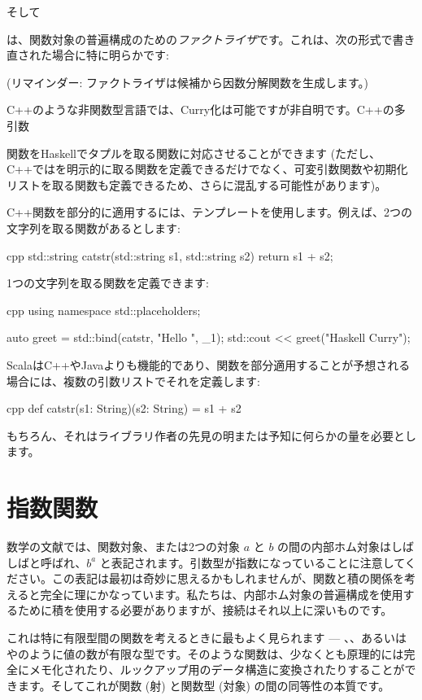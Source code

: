 そして

 は、関数対象の普遍構成のための\emph{ファクトライザ}です。これは、次の形式で書き直された場合に特に明らかです: 

 (リマインダー: ファクトライザは候補から因数分解関数を生成します。) 

C++のような非関数型言語では、Curry化は可能ですが非自明です。C++の多引数

関数をHaskellでタプルを取る関数に対応させることができます (ただし、C++ではを明示的に取る関数を定義できるだけでなく、可変引数関数や初期化リストを取る関数も定義できるため、さらに混乱する可能性があります)。

C++関数を部分的に適用するには、テンプレートを使用します。例えば、2つの文字列を取る関数があるとします: 

\begin{snip}{cpp}
std::string catstr(std::string s1, std::string s2) {
    return s1 + s2;
}
\end{snip}
1つの文字列を取る関数を定義できます: 

\begin{snip}{cpp}
using namespace std::placeholders;

auto greet = std::bind(catstr, "Hello ", _1);
std::cout << greet("Haskell Curry");
\end{snip}
ScalaはC++やJavaよりも機能的であり、関数を部分適用することが予想される場合には、複数の引数リストでそれを定義します: 

\begin{snip}{cpp}
def catstr(s1: String)(s2: String) = s1 + s2
\end{snip}
もちろん、それはライブラリ作者の先見の明または予知に何らかの量を必要とします。

\section{指数関数}

数学の文献では、関数対象、または2つの対象 $a$ と $b$ の間の内部ホム対象はしばしばと呼ばれ、$b^{a}$ と表記されます。引数型が指数になっていることに注意してください。この表記は最初は奇妙に思えるかもしれませんが、関数と積の関係を考えると完全に理にかなっています。私たちは、内部ホム対象の普遍構成を使用するために積を使用する必要がありますが、接続はそれ以上に深いものです。

これは特に有限型間の関数を考えるときに最もよく見られます --- 、、あるいはやのように値の数が有限な型です。そのような関数は、少なくとも原理的には完全にメモ化されたり、ルックアップ用のデータ構造に変換されたりすることができます。そしてこれが関数 (射) と関数型 (対象) の間の同等性の本質です。

